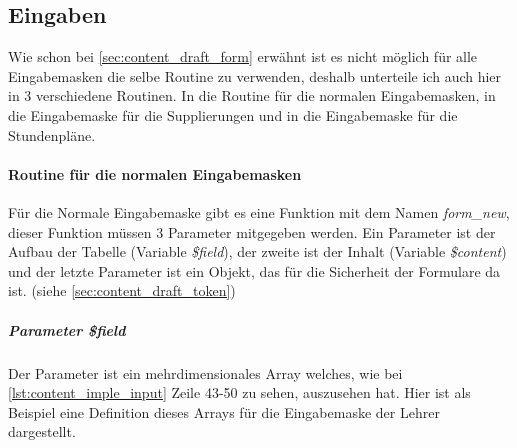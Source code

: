 \subsection{Eingaben}
%
%
%
% 
%
Wie schon bei \autoref{sec:content_draft_form} erwähnt ist es nicht möglich für alle Eingabemasken die selbe Routine zu verwenden, deshalb unterteile ich auch hier in 3 verschiedene Routinen. In die Routine für die normalen Eingabemasken, in die Eingabemaske für die Supplierungen und in die Eingabemaske für die Stundenpläne.
\paragraph{Routine für die normalen Eingabemasken}
Für die Normale Eingabemaske gibt es eine Funktion mit dem Namen \textit{form\_new}, dieser Funktion müssen 3 Parameter mitgegeben werden. Ein Parameter ist der Aufbau der Tabelle (Variable \textit{\$field}), der zweite ist der Inhalt (Variable \textit{\$content}) und der letzte Parameter ist ein Objekt, das für die Sicherheit der Formulare da ist. (siehe \autoref{sec:content_draft_token})\\
\subparagraph{Parameter \textit{\$field}}
Der Parameter ist ein mehrdimensionales Array welches, wie bei \autoref{lst:content_imple_input} Zeile 43-50 zu sehen, auszusehen hat. Hier ist als Beispiel eine Definition dieses Arrays für die Eingabemaske der Lehrer dargestellt.
